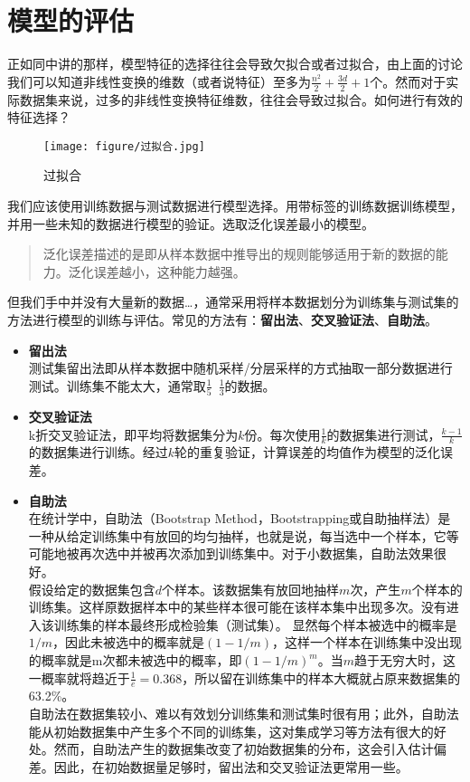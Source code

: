 \documentclass[twoside]{article}
\begin{document}
\section*{模型的评估}
正如同中讲的那样，模型特征的选择往往会导致欠拟合或者过拟合，由上面的讨论我们可以知道非线性变换的维数（或者说特征）至多为$\frac{n^2}{2}+\frac{3d}{2}+1$个。然而对于实际数据集来说，过多的非线性变换特征维数，往往会导致过拟合。如何进行有效的特征选择？
\begin{figure}[h]
    \centering
    \texttt{[image: figure/过拟合.jpg]}
    \caption{过拟合}
\end{figure}


我们应该使用训练数据与测试数据进行模型选择。用带标签的训练数据训练模型，并用一些未知的数据进行模型的验证。选取\color{red}泛化误差\color{black}最小的模型。
\begin{quote}
    泛化误差描述的是即从样本数据中推导出的规则能够适用于新的数据的能力。泛化误差越小，这种能力越强。
\end{quote}
但我们手中并没有大量新的数据\ldots，通常采用将样本数据划分为训练集与测试集的方法进行模型的训练与评估。常见的方法有：\textbf{留出法}、\textbf{交叉验证法}、\textbf{自助法}。
\begin{itemize}
    \item \textbf{留出法}\\
    测试集留出法即从样本数据中随机采样/分层采样的方式抽取一部分数据进行测试。训练集不能太大，通常取$\frac{1}{5}$\ $\frac{1}{3}$的数据。
    \item \textbf{交叉验证法}\\
    k折交叉验证法，即平均将数据集分为$k$份。每次使用$\frac{1}{k}$的数据集进行测试，$\frac{k-1}{k}$的数据集进行训练。经过$k$轮的重复验证，计算误差的均值作为模型的泛化误差。
    \item \textbf{自助法}\\
    在统计学中，自助法（Bootstrap Method，Bootstrapping或自助抽样法）是一种从给定训练集中有放回的均匀抽样，也就是说，每当选中一个样本，它等可能地被再次选中并被再次添加到训练集中。对于小数据集，自助法效果很好。\\
    假设给定的数据集包含$d$个样本。该数据集有放回地抽样$m$次，产生$m$个样本的训练集。这样原数据样本中的某些样本很可能在该样本集中出现多次。没有进入该训练集的样本最终形成检验集（测试集）。 显然每个样本被选中的概率是$1/m$，因此未被选中的概率就是$(1-1/m)$，这样一个样本在训练集中没出现的概率就是m次都未被选中的概率，即$(1-1/m)^m$。当$m$趋于无穷大时，这一概率就将趋近于$\frac{1}{e}=0.368$，所以留在训练集中的样本大概就占原来数据集的63.2\%。\\
    自助法在数据集较小、难以有效划分训练集和测试集时很有用；此外，自助法能从初始数据集中产生多个不同的训练集，这对集成学习等方法有很大的好处。然而，自助法产生的数据集改变了初始数据集的分布，这会引入估计偏差。因此，在初始数据量足够时，留出法和交叉验证法更常用一些。
\end{itemize}
\end{document}
